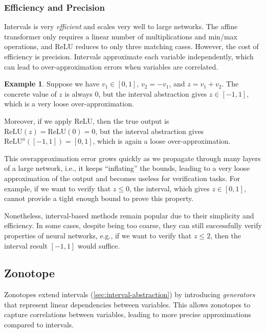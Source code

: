 \documentclass[oneside,11pt,dvipsnames]{book}
\numberwithin{equation}{section}
\theoremstyle{definition}
\newtheorem{example}{Example}[section]
\theoremstyle{remark}
\newcommand{\tvn}[1]{\iftoggle{usecomment}{{\color{red}{[TVN]: #1}}}{}}
\newcommand{\myrelu}{\mathrm{ReLU}}
\begin{document}
\subsubsection{Efficiency and Precision}

Intervals is very \emph{efficient} and scales very well to large networks. The affine transformer only requires a linear number of multiplications and min/max operations, and ReLU reduces to only three matching cases.
However, the cost of efficiency is precision. Intervals approximate each variable independently, which can lead to over-approximation errors when variables are correlated. 

\begin{example}

Suppose we have $v_1 \in [0, 1]$, $v_2 = -v_1$, and $z = v_1 + v_2$\tvn{Hai, do we have these kinds of correlation in DNN verification?}. The concrete value of $z$ is always 0, but the interval abstraction gives $z \in [-1, 1]$, which is a very loose over-approximation. 

Moreover, if we apply ReLU, then the true output is $\myrelu(z) = \myrelu(0) = 0$, but the interval abstraction gives $\myrelu^a([-1, 1]) = [0, 1]$, which is again a loose over-approximation.
\end{example}

This overapproximation error grows quickly as we propagate through many layers of a large network, i.e., it keeps ``inflating'' the bounds, leading to a very loose approximation of the output and becomes useless for verification tasks. For example, if we want to verify that $z \leq 0$, the interval, which gives $z \in [0,1]$, cannot provide a tight enough bound to prove this property.

Nonetheless, interval-based methods remain popular due to their simplicity and efficiency. In some cases, despite being too coarse, they can still successfully verify properties of neural networks, e.g., if we want to verify that $z \le 2$, then the interval result $[-1, 1]$ would suffice.

\subsection{Zonotope}\label{sec:zonotope-abstraction}

Zonotopes extend intervals (\autoref{sec:interval-abstraction}) by introducing \emph{generators} that represent linear dependencies between variables. This allows zonotopes to capture correlations between variables, leading to more precise approximations compared to intervals.
\end{document}
